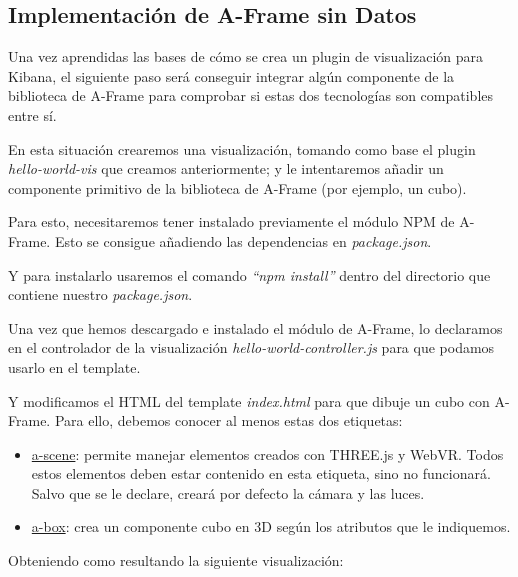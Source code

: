 \documentclass[a4paper, 12pt]{book}
\begin{document}
\subsection{Implementación de A-Frame sin Datos}
\label{sec:aframesindatos}

Una vez aprendidas las bases de cómo se crea un plugin de visualización para Kibana, el siguiente paso será conseguir integrar algún componente de la biblioteca de A-Frame para comprobar si estas dos tecnologías son compatibles entre sí.

En esta situación crearemos una visualización, tomando como base el plugin \textit{hello-world-vis} que creamos anteriormente; y le intentaremos añadir un componente primitivo de la biblioteca de A-Frame (por ejemplo, un cubo).

Para esto, necesitaremos tener instalado previamente el módulo NPM de A-Frame. Esto se consigue añadiendo las dependencias en \textit{package.json}.



Y  para instalarlo usaremos el comando \textit{“npm install”} dentro del directorio que contiene nuestro \textit{package.json}.

Una vez que hemos descargado e instalado el módulo de A-Frame, lo declaramos en el controlador de la visualización \textit{hello-world-controller.js} para que podamos usarlo en el template.



Y modificamos el HTML del template \textit{index.html} para que dibuje un cubo con A-Frame. Para ello, debemos conocer al menos estas dos etiquetas: 

\begin{itemize}
    \item \underline{a-scene}: permite manejar elementos creados con THREE.js y WebVR. Todos estos elementos deben estar contenido en esta etiqueta, sino no funcionará. Salvo que se le declare, creará por defecto la cámara y las luces.
    \item \underline{a-box}: crea un componente cubo en 3D según los atributos que le indiquemos.
\end{itemize}



Obteniendo como resultando la siguiente visualización:
\end{document}
